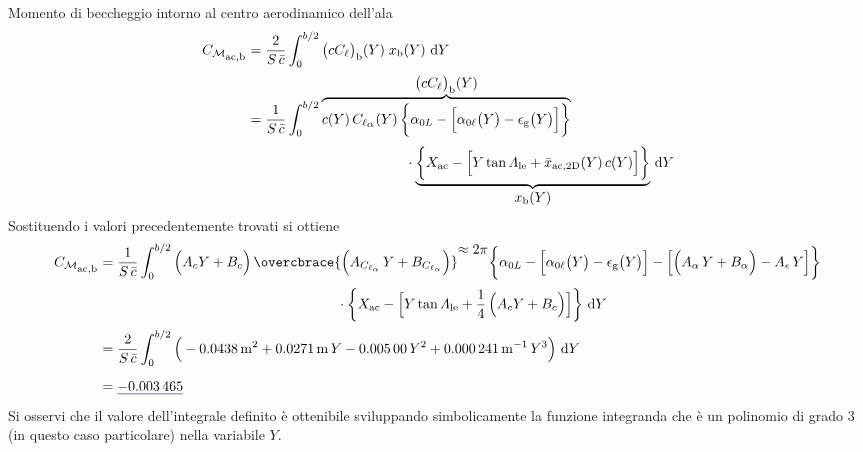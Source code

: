 \documentclass[[12pt,twoside]{book}
\begin{document}
\begin{myExampleX}{Momento di beccheggio intorno al centro aerodinamico dell'ala}{}
\[
\begin{split}
C_{\mathcal{M}_\mathlarger{\mathrm{ac,b}}} 
  & {}=
  \frac{2}{S\,\bar{c}} \int_0^{b/2} \big(cC_{\ell}\big)_\mathrm{b}(Y) \; x_\mathrm{b}(Y)\, \diff{Y}
\\[1pt]
  & {}=
  \frac{1}{S\,\bar{c}} \int_0^{b/2}
\overbrace{%
c(Y) \, C_{\ell_\mathlarger{\alpha}}(Y) \,
    \bigg\{ \alpha_{0L} - \Big[ \alpha_{0\ell}\big(Y\big) - \epsilon_\mathrm{g}\big(Y\big) \Big] \bigg\}
}^{ \mathlarger{ \big(cC_{\ell}\big)_\mathrm{b}(Y) } }
\\[3pt]
  & \rule{4cm}{0pt}
%
    \cdot
    \underbrace{%
    \bigg\{ 
      X_\mathrm{ac} 
        - \Big[ Y \tan \Lambda_\mathrm{le} + \bar{x}_{\mathrm{ac,2D}} (Y) \, c(Y) \Big]
    \bigg\} 
    }_{ \mathlarger{ x_\mathrm{b}(Y) } }
    \, \diff{Y}
\end{split}
\]
\noindent
Sostituendo i valori precedentemente trovati si ottiene
\[
 \begin{split}
C_{\mathcal{M}_\mathlarger{\mathrm{ac,b}}} 
  & {}=
  \frac{1}{S\,\bar{c}} \int_0^{b/2}
    \Big( A_c Y + B_c \Big)
    \, 
    \overcbrace{%
      \Big( A_{C_{\ell_\alpha}} \, Y + B_{C_{\ell_\alpha}} \Big)
    }^{ \mathlarger{\approx 2\pi} }
    \bigg\{ \alpha_{0L} 
       - \Big[ \alpha_{0\ell}\big(Y\big) - \epsilon_\mathrm{g}\big(Y\big) \Big] 
      - \Big[ \Big( A_{\alpha} \, Y + B_{\alpha} \Big) - A_{\epsilon} \, Y \Big]
    \bigg\}
\\[2pt]
  & \hfill \rule{6cm}{0pt}
%
    \cdot
    \bigg\{ 
      X_\mathrm{ac} 
        - \Big[ Y \tan \Lambda_\mathrm{le} + \frac{1}{4} \, \Big( A_c Y + B_c \Big) \Big]
    \bigg\} 
    \, \diff{Y}
\\[2pt]
  & {}= 
  \frac{2}{S\,\bar{c}} \int_0^{b/2} 
    \Big( 
      \SI[round-mode=figures,round-precision=3,
        ]{\myCoeffEWing}{\metre^2}
      + 
      \SI[round-mode=figures,round-precision=3,
        ]{\myCoeffFWing}{\metre}\, Y
      \SI[round-mode=figures,round-precision=3,
        ]{\myCoeffGWing}{}\, Y^2
      +
      \SI[round-mode=figures,round-precision=3,
        ]{\myCoeffHWing}{\metre^{-1}}\, Y^3
    \Big)
    \, \diff{Y}
\\[4pt]
  & {}= \mathunderline{mydarkblue}{ \SI[round-precision=5]{\myCmZeroBWing}{} }
\end{split}
\]
Si osservi che il valore dell'integrale definito è ottenibile sviluppando simbolicamente
la funzione integranda che è un polinomio di grado $3$ (in questo caso particolare) nella variabile $Y$.


\end{myExampleX}
\end{document}

